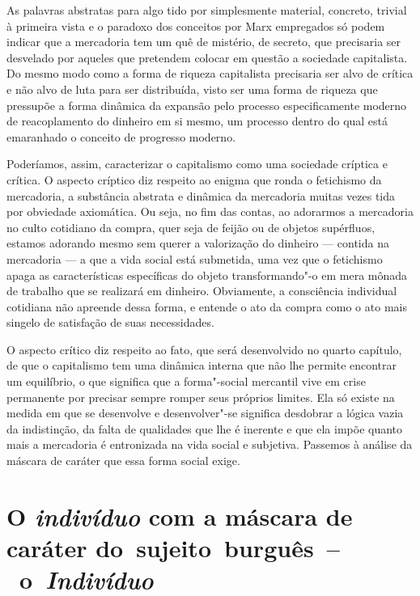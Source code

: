 As palavras abstratas para algo tido por simplesmente material,
concreto, trivial à primeira vista e o paradoxo dos conceitos por Marx
empregados só podem indicar que a mercadoria tem um quê de mistério, de
secreto, que precisaria ser desvelado por aqueles que pretendem colocar
em questão a sociedade capitalista. Do mesmo modo como a forma de
riqueza capitalista precisaria ser alvo de crítica e não alvo de luta
para ser distribuída, visto ser uma forma de riqueza que pressupõe a
forma dinâmica da expansão pelo processo especificamente moderno de
reacoplamento do dinheiro em si mesmo, um processo dentro do qual está
emaranhado o conceito de progresso moderno.

Poderíamos, assim, caracterizar o capitalismo como uma sociedade
críptica e crítica. O aspecto críptico diz respeito ao enigma que ronda
o fetichismo da mercadoria, a substância abstrata e dinâmica da
mercadoria muitas vezes tida por obviedade axiomática. Ou seja, no fim
das contas, ao adorarmos a mercadoria no culto cotidiano da compra, quer
seja de feijão ou de objetos supérfluos, estamos adorando mesmo sem
querer a valorização do dinheiro --- contida na mercadoria --- a que a
vida social está submetida, uma vez que o fetichismo apaga as
características específicas do objeto transformando"-o em mera mônada de
trabalho que se realizará em dinheiro. Obviamente, a consciência
individual cotidiana não apreende dessa forma, e entende o ato da compra
como o ato mais singelo de satisfação de suas necessidades.

O aspecto crítico diz respeito ao fato, que será desenvolvido no quarto
capítulo, de que o capitalismo tem uma dinâmica interna que não lhe
permite encontrar um equilíbrio, o que significa que a forma"-social
mercantil vive em crise permanente por precisar sempre romper seus
próprios limites. Ela só existe na medida em que se desenvolve e
desenvolver"-se significa desdobrar a lógica vazia da indistinção, da
falta de qualidades que lhe é inerente e que ela impõe quanto mais a
mercadoria é entronizada na vida social e subjetiva. Passemos à análise
da máscara de caráter que essa forma social exige.

\section{O \emph{indivíduo} com a máscara de caráter do~sujeito~burguês~--~o~\emph{Indivíduo}}

